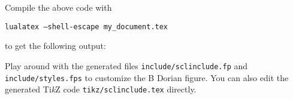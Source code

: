 \documentclass[12pt,letterpaper]{article}
\begin{document}
Compile the above code with \begin{center}\texttt{lualatex --shell-escape my\_document.tex}\end{center} to get the following output:



Play around with the generated files \texttt{include/sclinclude.fp} and \texttt{include/styles.fps} to customize the B Dorian figure. You can also edit the generated Ti\textit{k}Z code \texttt{tikz/sclinclude.tex} directly.







% 


% 


\end{document}
